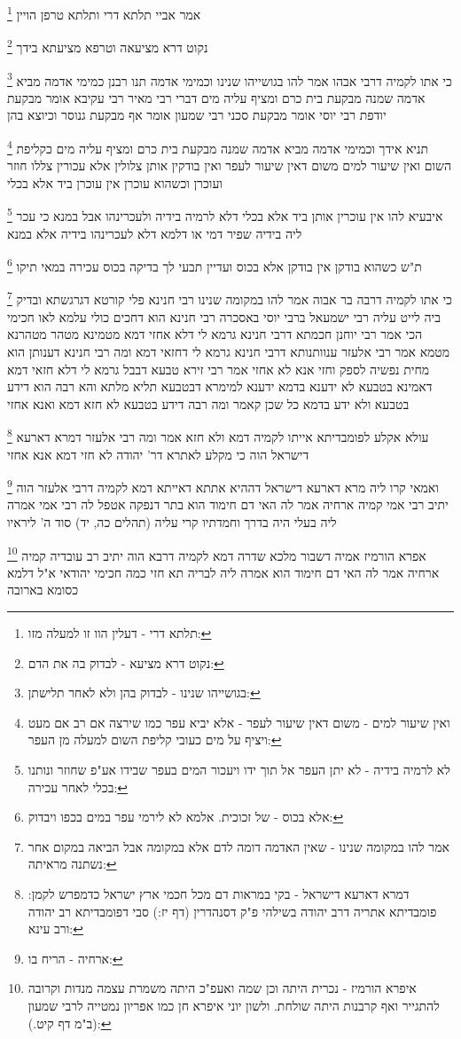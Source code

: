 \documentclass[12pt, openany]{book}
\newcommand{\footnotecomment}[1]{
	\renewcommand\thefootnote{}
	\footnote{#1}}
\newcommand{\commenta}[1]{\footnotecomment{#1}}
\begin{document}
{\commenta{תלתא דרי - דעלין הוו זו למעלה מזו:}
אמר אביי תלתא דרי ותלתא טרפן הויין
\commenta{נקוט דרא מציעא - לבדוק בה את הדם:}
נקוט דרא מציעאה וטרפא מציעתא בידך 
\commenta{בגושייהו שנינו - לבדוק בהן ולא לאחר תלישתן:}
כי אתו לקמיה דרבי אבהו אמר להו בגושייהו שנינו
וכמימי אדמה תנו רבנן כמימי אדמה מביא אדמה שמנה מבקעת בית כרם ומציף עליה מים דברי רבי מאיר רבי עקיבא אומר מבקעת יודפת רבי יוסי אומר מבקעת סכני רבי שמעון אומר אף מבקעת גנוסר וכיוצא בהן 
\commenta{ואין שיעור למים - משום דאין שיעור לעפר - אלא יביא עפר כמו שירצה אם רב אם מעט ויציף על מים כעובי קליפת השום למעלה מן העפר:}
תניא אידך וכמימי אדמה מביא אדמה שמנה מבקעת בית כרם ומציף עליה מים כקליפת השום ואין שיעור למים משום דאין שיעור לעפר ואין בודקין אותן צלולין אלא עכורין צללו חוזר ועוכרן וכשהוא עוכרן אין עוכרן ביד אלא בכלי 
\commenta{לא לרמיה בידיה - לא יתן העפר אל תוך ידו ויעכור המים בעפר שבידו אע"פ שחוזר ונותנו בכלי לאחר עכירה:}
איבעיא להו אין עוכרין אותן ביד אלא בכלי דלא לרמיה בידיה ולעכרינהו אבל במנא כי עכר ליה בידיה שפיר דמי או דלמא דלא לעכרינהו בידיה אלא במנא 
\commenta{אלא בכוס - של זכוכית. אלמא לא לירמי עפר במים בכפו ויבדוק:}
ת"ש כשהוא בודקן אין בודקן אלא בכוס ועדיין תבעי לך בדיקה בכוס עכירה במאי תיקו 
\commenta{אמר להו במקומה שנינו - שאין האדמה דומה לדם אלא במקומה אבל הביאה במקום אחר נשתנה מראיתה:}
כי אתו לקמיה דרבה בר אבוה אמר להו במקומה שנינו רבי חנינא פלי קורטא דגרגשתא ובדיק ביה לייט עליה רבי ישמעאל ברבי יוסי באסכרה
רבי חנינא הוא דחכים כולי עלמא לאו חכימי הכי 
אמר רבי יוחנן חכמתא דרבי חנינא גרמא לי דלא אחזי דמא מטמינא מטהר מטהרנא מטמא אמר רבי אלעזר ענוותנותא דרבי חנינא גרמא לי דחזאי דמא ומה רבי חנינא דענותן הוא מחית נפשיה לספק וחזי אנא לא אחזי 
אמר רבי זירא טבעא דבבל גרמא לי דלא חזאי דמא דאמינא בטבעא לא ידענא בדמא ידענא 
למימרא דבטבעא תליא מלתא והא רבה הוא דידע בטבעא ולא ידע בדמא כל שכן קאמר ומה רבה דידע בטבעא לא חזא דמא ואנא אחזי 
\commenta{דמרא דארעא דישראל - בקי במראות דם מכל חכמי ארץ ישראל כדמפרש לקמן: פומבדיתא אתריה דרב יהודה בשילהי פ"ק דסנהדרין (דף יז:) סבי דפומבדיתא רב יהודה ורב עינא:}
עולא אקלע לפומבדיתא אייתו לקמיה דמא ולא חזא אמר ומה רבי אלעזר דמרא דארעא דישראל הוה כי מקלע לאתרא דר' יהודה לא חזי דמא אנא אחזי 
\commenta{ארחיה - הריח בו:}
ואמאי קרו ליה מרא דארעא דישראל דההיא אתתא דאייתא דמא לקמיה דרבי אלעזר הוה יתיב רבי אמי קמיה ארחיה אמר לה האי דם חימוד הוא בתר דנפקה אטפל לה רבי אמי אמרה ליה בעלי היה בדרך וחמדתיו קרי עליה (תהלים כה, יד) סוד ה' ליראיו 
\commenta{איפרא הורמיז - נכרית היתה וכן שמה ואעפ"כ היתה משמרת עצמה מנדות וקרובה להתגייר ואף קרבנות היתה שולחת. ולשון יוני איפרא חן כמו אפריון נמטייה לרבי שמעון (ב"מ דף קיט.):}
אפרא הורמיז אמיה דשבור מלכא שדרה דמא לקמיה דרבא הוה יתיב רב עובדיה קמיה ארחיה אמר לה האי דם חימוד הוא אמרה ליה לבריה תא חזי כמה חכימי יהודאי א"ל דלמא כסומא בארובה 
}
\end{document}
